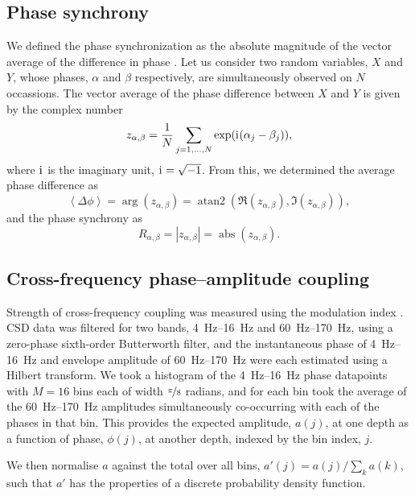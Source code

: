 \subsection{Phase synchrony}

We defined the phase synchronization as the absolute magnitude of the vector average of the difference in phase \citep{Kreuz2011}.
Let us consider two random variables, $X$ and $Y$, whose phases, $\alpha$ and $\beta$ respectively, are simultaneously observed on $N$ occassions.
The vector average of the phase difference between $X$ and $Y$ is given by the complex number
\begin{equation}
z_{\alpha, \beta} = \frac{1}{N} \sum_{j = 1, \ldots, N} \exp({\mathrm{i}\mkern1mu} (\alpha_j - \beta_j))
,\end{equation}
where ${\mathrm{i}\mkern1mu}$ is the imaginary unit, ${\mathrm{i}\mkern1mu} = \sqrt{-1}$.
From this, we determined the average phase difference as
\begin{equation}
\left<\Delta\phi\right> = \arg(z_{\alpha, \beta}) = \operatorname{atan2}(\Re(z_{\alpha, \beta}), \Im(z_{\alpha, \beta}))
,\end{equation}
and the phase synchrony as
\begin{equation}
R_{\alpha, \beta} = |z_{\alpha, \beta}| = \operatorname{abs}(z_{\alpha, \beta})
.\end{equation}


\subsection{Cross-frequency phase--amplitude coupling}
\label{sec:lam_cfc_method}

Strength of cross-frequency coupling was measured using the modulation index \citep{Tort2010}.
\ac{CSD} data was filtered for two bands, \SIrange{4}{16}{Hz} and \SIrange{60}{170}{Hz}, using a zero-phase sixth-order Butterworth filter, and the instantaneous phase of \SIrange{4}{16}{Hz} and envelope amplitude of \SIrange{60}{170}{Hz} were each estimated using a Hilbert transform.
We took a histogram of the \SIrange{4}{16}{Hz} phase datapoints with $M = 16$ bins each of width $\nicefrac{\pi}{8}$ radians, and for each bin took the average of the \SIrange{60}{170}{Hz} amplitudes simultaneously co-occurring with each of the phases in that bin.
This provides the expected amplitude, $a(j)$, at one depth as a function of phase, $\phi(j)$, at another depth, indexed by the bin index, $j$.

We then normalise $a$ against the total over all bins, $a'(j) = a(j) / \sum_k a(k)$,
such that $a'$ has the properties of a discrete probability density function.

